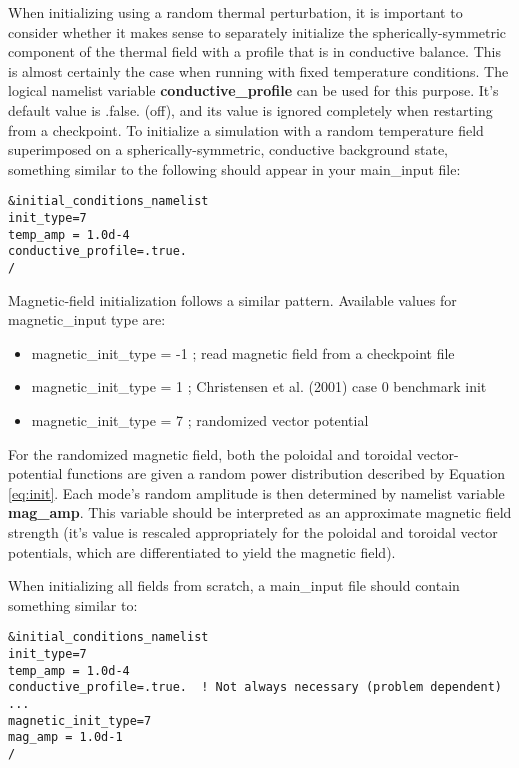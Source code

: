 When initializing using a random thermal perturbation, it is important to consider whether it makes sense to separately initialize the spherically-symmetric component of the thermal field with a profile that is in conductive balance.  This is almost certainly the case when running with fixed temperature conditions.  The logical namelist variable \textbf{conductive\_profile} can be used for this purpose.  It's default value is .false. (off), and its value is ignored completely when restarting from a checkpoint.   To initialize a simulation with a random temperature field superimposed on a spherically-symmetric, conductive background state, something similar to the following should appear in your main\_input file:
\begin{lstlisting}
&initial_conditions_namelist
init_type=7
temp_amp = 1.0d-4
conductive_profile=.true.
/
\end{lstlisting}

Magnetic-field initialization follows a similar pattern.  Available values for magnetic\_input type are:
\begin{itemize}
\item magnetic\_init\_type = -1 ; read magnetic field from a checkpoint file
\item magnetic\_init\_type = 1 ; Christensen et al. (2001) case 0 benchmark init
\item magnetic\_init\_type = 7 ; randomized vector potential
\end{itemize}

For the randomized magnetic field, both the poloidal and toroidal vector-potential functions are given a random power distribution described by Equation \ref{eq:init}.  Each mode's random amplitude is then determined by namelist variable \textbf{mag\_amp}.   This variable should be interpreted as an approximate magnetic field strength (it's value is rescaled appropriately for the poloidal and toroidal vector potentials, which are differentiated to yield the magnetic field).

When initializing all fields from scratch, a main\_input file should contain something similar to:
\begin{lstlisting}
&initial_conditions_namelist
init_type=7
temp_amp = 1.0d-4
conductive_profile=.true.  ! Not always necessary (problem dependent) ...
magnetic_init_type=7
mag_amp = 1.0d-1
/
\end{lstlisting}

